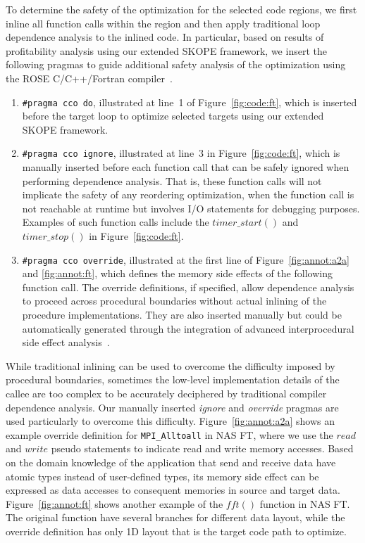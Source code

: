 To determine the safety of the optimization for the selected code regions,
  we first inline all function calls within the region and then apply traditional loop dependence analysis to the inlined code.
In particular, based on results of profitability analysis using our extended SKOPE framework, we insert the following pragmas to guide additional safety analysis of the optimization using the ROSE C/C++/Fortran compiler~\cite {ROSE}.
\begin{enumerate}
\item \texttt{\#pragma cco do}, illustrated at line~1 of Figure~\ref{fig:code:ft}, which is inserted before the target loop to optimize selected targets using our extended SKOPE framework.
\item \texttt{\#pragma cco ignore},
 illustrated at line~3 in Figure~\ref{fig:code:ft}, which is manually inserted before each function call that can be safely ignored when performing dependence analysis. That is, these function calls will not implicate the safety of any reordering optimization, when the function call is not reachable at runtime but involves I/O statements for debugging purposes. Examples of such function calls include the $timer\_start()$ and $timer\_stop()$ in Figure~\ref{fig:code:ft}.

\item \texttt{\#pragma cco override},  illustrated at the first line of Figure~\ref{fig:annot:a2a} and \ref{fig:annot:ft},
which defines the memory side effects of the following function call.
The override definitions, if specified, allow dependence analysis to proceed across procedural boundaries without actual inlining of the procedure implementations. They are also inserted manually but could be automatically generated through the integration of advanced interprocedural side effect analysis~\cite{kennedy:cpld88}.

\end{enumerate}
While traditional inlining can be used to overcome the difficulty imposed by procedural boundaries, sometimes the
 low-level implementation details of the callee are too complex to be accurately deciphered by traditional compiler dependence analysis. Our manually inserted \emph{ignore} and \emph{override} pragmas are used particularly to overcome this difficulty.
 Figure~\ref{fig:annot:a2a} shows an example override definition for \texttt{MPI\_Alltoall} in NAS FT,
  where we use the $read$ and $write$ pseudo statements to indicate read and write memory accesses.
Based on the domain knowledge of the application that send and receive data have atomic types instead of user-defined types,
  its memory side effect can be expressed as data accesses to consequent memories in source and target data.
Figure~\ref{fig:annot:ft} shows another example of the $fft()$ function in NAS FT.
The original function have several branches for different data layout,
  while the override definition has only 1D layout that is the target code path to optimize.

